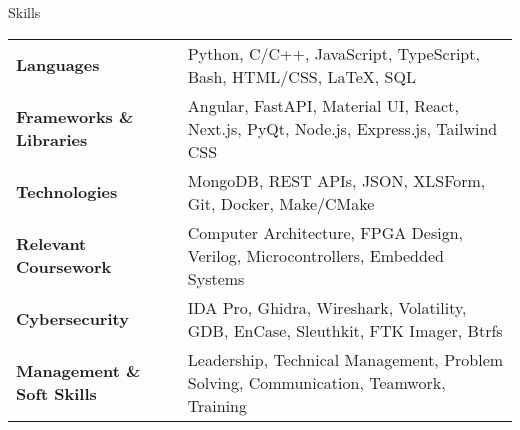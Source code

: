 \documentclass{resume} %
\date{\today}
\begin{document}
\begin{rSection}{Skills}

\begin{tabular}{ @{} >{\bfseries}l @{\hspace{8ex}} l }
Languages \ & Python, C/C++, JavaScript, TypeScript, Bash, HTML/CSS, \LaTeX, SQL \\
Frameworks \& Libraries \ & Angular, FastAPI, Material UI, React, Next.js, PyQt, Node.js, Express.js, Tailwind CSS \\
Technologies \ & MongoDB, REST APIs, JSON, XLSForm, Git, Docker, Make/CMake \\
Relevant Coursework \ & Computer Architecture, FPGA Design, Verilog, Microcontrollers, Embedded Systems \\
Cybersecurity \ & IDA Pro, Ghidra, Wireshark, Volatility, GDB, EnCase, Sleuthkit, FTK Imager, Btrfs \\
Management \& Soft Skills \ & Leadership, Technical Management, Problem Solving, Communication, Teamwork, Training \\
\end{tabular}
\end{rSection}
\end{document}
